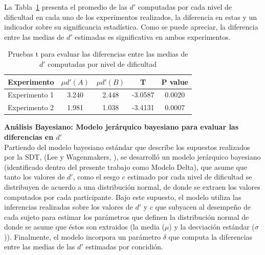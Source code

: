 La Tabla~\ref{Tabla_t-Dprimas} presenta el promedio de las $d'$ computadas por cada nivel de dificultad en cada uno de los experimentos realizados, la diferencia en estas y un indicador sobre su significancia estadística. Como se puede apreciar, la diferencia entre las medias de $d'$ estimadas es significativa en ambos experimentos.\\

\begin{table}
\caption[Prueba T para evaluar las diferencias entre las medias de $d'$ por nivel de dificultad]{Pruebas t para evaluar las diferencias entre las medias de $d'$ computadas por nivel de dificultad}
\label{Tabla_t-Dprimas}
\centering
\begin{tabular}{l | c c c c}
\toprule
\textbf{Experimento} & \textbf{$\mu d'(A)$} & \textbf{$\mu d'(B)$} & \textbf{T}  & \textbf{P value}\\
\midrule
Experimento 1 & 3.240 & 2.448 & -3.0587 & 0.0020 \\
Experimento 2 & 1.981 & 1.038 & -3.4131 & 0.0007 \\
\bottomrule
\end{tabular}
\end{table}


\textbf{Análisis Bayesiano: Modelo jerárquico bayesiano para evaluar las diferencias en $d'$}\\

Partiendo del modelo bayesiano estándar que describe los supuestos realizados por la SDT, (Lee y Wagenmakers, \citeyear{LeeBook}), se desarrolló un modelo jerárquico bayesiano (identificado dentro del presente trabajo como Modelo Delta), que asume que tanto los valores de $d'$, como el sesgo $c$ estimado por cada nivel de dificultad se distribuyen de acuerdo a una distribución normal, de donde se extraen los valores computados por cada participante. Bajo este supuesto, el modelo utiliza las inferencias realizadas sobre los valores de $d'$ y $c$ que subyacen al desempeño de cada sujeto para estimar los parámetros que definen la distribución normal de donde se asume que éstos son extraidos (la media ($\mu$) y la desviación estándar ($\sigma$)). Finalmente, el modelo incorpora un parámetro $\delta$ que computa la diferencias entre las medias de las $d'$ estimadas por concidión.\\

